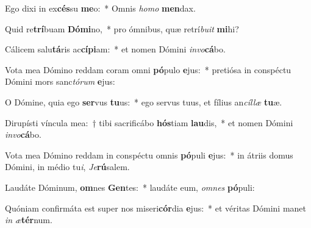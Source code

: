 \item Ego dixi in ex\textbf{cés}su \textbf{me}o:~* Omnis \textit{ho}\textit{mo} \textbf{men}dax.
\item Quid re\textbf{trí}buam \textbf{Dó}\textbf{mi}no,~* pro ómnibus, quæ retrí\textit{bu}\textit{it} \textbf{mi}hi?
\item Cálicem salu\textbf{tá}ris ac\textbf{cí}\textbf{pi}am:~* et nomen Dómini \textit{in}\textit{vo}\textbf{cá}bo.
\item Vota mea Dómino reddam coram omni \textbf{pó}pulo \textbf{e}jus:~* pretiósa in conspéctu Dómini mors sanc\textit{tó}\textit{rum} \textbf{e}jus:
\item O Dómine, quia ego \textbf{ser}vus \textbf{tu}us:~* ego servus tuus, et fílius an\textit{cíl}\textit{læ} \textbf{tu}æ.
\item Dirupísti víncula mea:~† tibi sacrificábo \textbf{hós}tiam \textbf{lau}dis,~* et nomen Dómini \textit{in}\textit{vo}\textbf{cá}bo.
\item Vota mea Dómino reddam in conspéctu omnis \textbf{pó}puli \textbf{e}jus:~* in átriis domus Dómini, in médio tu\textit{i}, \textit{Je}\textbf{rú}salem.
\item Laudáte Dóminum, \textbf{om}nes \textbf{Gen}tes:~* laudáte eum, \textit{om}\textit{nes} \textbf{pó}puli:
\item Quóniam confirmáta est super nos miseri\textbf{cór}dia \textbf{e}jus:~* et véritas Dómini manet \textit{in} \textit{æ}\textbf{tér}num.
